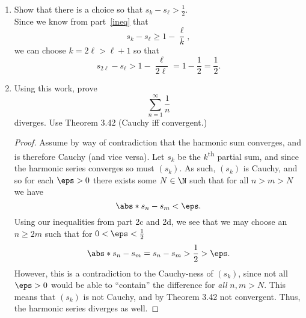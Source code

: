 \documentclass{article}
\begin{document}
\begin{enumerate}
\begin{enumerate}
      \item Show that there is a choice so that $s_{k} - s_{\ell} > \frac{1}{2}$.\\
            Since we know from part~\ref{ineq} that
            \[
            s_{k} - s_{\ell} \ge 1 - \frac{\ell}{k},
            \]
            we can choose $k = 2\ell > \ell + 1$ so that
            \[
            s_{2\ell} - s_{\ell} > 1 - \frac{\ell}{2\ell} = 1 - \frac{1}{2} = \frac{1}{2}.
            \]

      \item Using this work, prove
            \[
            \sum_{n = 1}^{\infty}\frac{1}{n}
            \]
            diverges. Use Theorem 3.42 (Cauchy iff convergent.)\\
            \begin{proof}
              Assume by way of contradiction that the harmonic sum converges, and is therefore Cauchy (and vice versa).
              Let $s_{k}$ be the $k$\textsuperscript{th} partial sum, and since the harmonic series converges so must $(s_{k})$.
              As such, $(s_{k})$ is Cauchy, and so for each $\eps > 0$ there exists some $N \in \N$ such that for all $n > m > N$
              we have
              \[
                \abs*{s_{n} - s_{m}} < \eps.
              \]
              Using our inequalities from part 2c and 2d, we see that we may choose an $n \ge 2m$ such that for $0 < \eps < \frac{1}{2}$
              \[
                \abs*{s_{n} - s_{m}} = s_{n} - s_{m} > \frac{1}{2} > \eps.
              \]
              However, this is a contradiction to the Cauchy-ness of $(s_{k})$, since not all $\eps > 0$ would be able to ``contain''
              the difference for \emph{all} $n, m > N$. This means that $(s_{k})$ is not Cauchy, and by Theorem 3.42 not convergent.
              Thus, the harmonic series diverges as well.
            \end{proof}
    \end{enumerate}

\end{enumerate}
\end{document}
